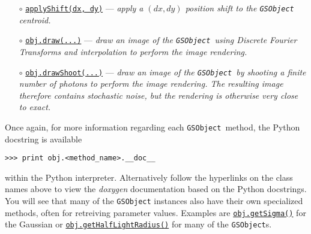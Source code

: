 \documentclass[preprint,11pt]{aastex}
\newcommand{\gsobject}{{\tt GSObject}}
\begin{document}
\begin{itemize}
{  anti-clockwise) to the \texttt{GSObject}, where \texttt{theta} is a
  \texttt{galsim.Angle} instance (see Section \ref{sect:misc}). }
\item[$\circ$]
  \href{http://galsim-developers.github.com/GalSim/classgalsim_1_1base_1_1_g_s_object.html#a6b547741eeec4086de9abe227dae9325}{\texttt{applyShift(dx,
      dy)}} --- \emph{apply a $(dx, dy)$ position shift to the
    \texttt{GSObject} centroid.}
\item[$\circ$]
  \href{http://galsim-developers.github.com/GalSim/classgalsim_1_1base_1_1_g_s_object.html#ae0b346a8b438dedbc7f60a52220869d8}{\texttt{obj.draw(...)}}
  --- \emph{draw an image of the \texttt{GSObject}~using Discrete Fourier
  Transforms and interpolation to perform the image rendering.}
\item[$\circ$]
  \href{http://galsim-developers.github.com/GalSim/classgalsim_1_1base_1_1_g_s_object.html#a42ac334d2840ba3fa832988e998beca0}{\texttt{obj.drawShoot(...)}}
  --- \emph{draw an image of the \texttt{GSObject}~by shooting a finite number of
  photons to perform the image rendering.  The resulting image
  therefore contains stochastic noise, but the rendering is otherwise
  very close to exact.}
\end{itemize}
Once again, for more information regarding each \gsobject~method,
the Python docstring is available

{\tt >>> print obj.<method\_name>.\_\_doc\_\_}

within the Python interpreter.  Alternatively follow the hyperlinks on
the class names above to view the \emph{doxygen} documentation based
on the Python docstrings.  You will see that many of the \gsobject
instances also have their own specialized methods, often for
retreiving parameter values. Examples are \href{http://galsim-developers.github.com/GalSim/classgalsim_1_1base_1_1_gaussian.html#a418f2826a7b8934cfedc181de23ce826}{\texttt{obj.getSigma()}} for
the Gaussian or \href{http://galsim-developers.github.com/GalSim/classgalsim_1_1base_1_1_sersic.html#ad6ca39293c6b478fc052d07ea51d086f}{\texttt{obj.getHalfLightRadius()}} for many of the
\gsobject s.
\end{document}
